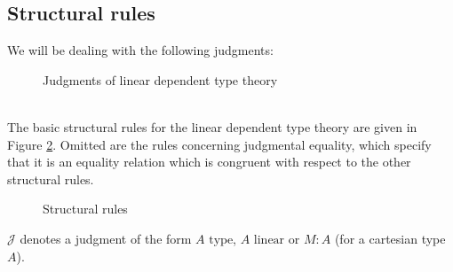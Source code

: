 \subsection{Structural rules}
We will be dealing with the following judgments:\\
\begin{figure}[h]
\caption{Judgments of linear dependent type theory}
\label{judgments}
\end{figure}
\\
The basic structural rules for the linear dependent type theory are given in Figure \ref{struc}. Omitted are the rules concerning judgmental equality, which specify that it is an equality relation which is congruent with respect to the other structural rules.
\begin{figure}[H]
  \centering
  
  \caption{Structural rules}
  \label{struc}
\end{figure}
$\mathcal{J}$ denotes a judgment of the form $A \text{ type}$, $A \text{ linear}$ or $M : A$ (for a cartesian type $A$).
